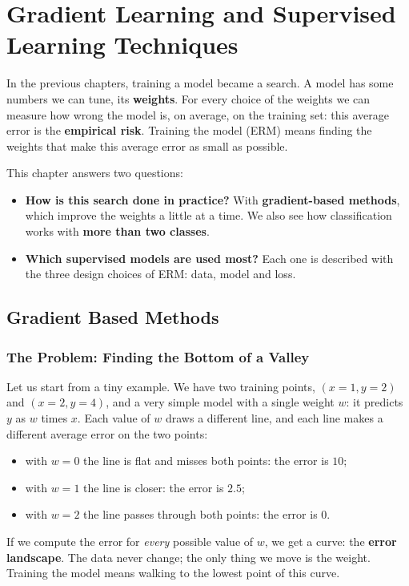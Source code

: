 \chapter{Gradient Learning and Supervised Learning Techniques}

In the previous chapters, training a model became a search. A model has some numbers we can tune, its \textbf{weights}. For every choice of the weights we can measure how wrong the model is, on average, on the training set: this average error is the \textbf{empirical risk}. Training the model (ERM) means finding the weights that make this average error as small as possible.

This chapter answers two questions:
\begin{itemize}
    \item \textbf{How is this search done in practice?} With \textbf{gradient-based methods}, which improve the weights a little at a time. We also see how classification works with \textbf{more than two classes}.
    \item \textbf{Which supervised models are used most?} Each one is described with the three design choices of ERM: data, model and loss.
\end{itemize}

\section{Gradient Based Methods}

\subsection{The Problem: Finding the Bottom of a Valley}
Let us start from a tiny example. We have two training points, $(x = 1, y = 2)$ and $(x = 2, y = 4)$, and a very simple model with a single weight $w$: it predicts $y$ as $w$ times $x$. Each value of $w$ draws a different line, and each line makes a different average error on the two points:
\begin{itemize}
    \item with $w = 0$ the line is flat and misses both points: the error is $10$;
    \item with $w = 1$ the line is closer: the error is $2.5$;
    \item with $w = 2$ the line passes through both points: the error is $0$.
\end{itemize}

If we compute the error for \emph{every} possible value of $w$, we get a curve: the \textbf{error landscape}. The data never change; the only thing we move is the weight. Training the model means walking to the lowest point of this curve.

